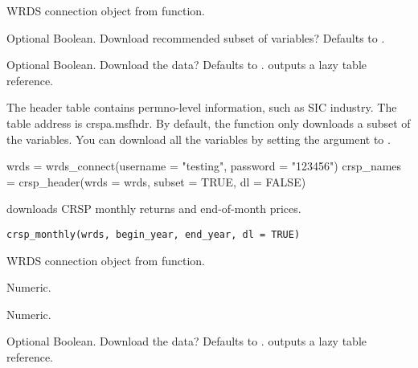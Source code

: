 \documentclass[a4paper]{book}
\begin{document}
%
\begin{Arguments}
\begin{ldescription}
\item[\code{wrds}] WRDS connection object from  function.

\item[\code{subset}] Optional Boolean. Download recommended subset of variables? Defaults to .

\item[\code{dl}] Optional Boolean. Download the data? Defaults to .  outputs a
lazy  table reference.
\end{ldescription}
\end{Arguments}
%
\begin{Details}\relax
The header table contains permno-level information, such as SIC industry. The table
address is crspa.msfhdr. By default, the function only downloads a subset of the variables.
You can download all the variables by setting the  argument to .
\end{Details}
%
\begin{Examples}
\begin{ExampleCode}
wrds = wrds_connect(username = "testing", password = "123456")
crsp_names = crsp_header(wrds = wrds, subset = TRUE, dl = FALSE)
\end{ExampleCode}
\end{Examples}
%
\begin{Description}\relax
{} downloads CRSP monthly returns and end-of-month prices.
\end{Description}
%
\begin{Usage}
\begin{verbatim}
crsp_monthly(wrds, begin_year, end_year, dl = TRUE)
\end{verbatim}
\end{Usage}
%
\begin{Arguments}
\begin{ldescription}
\item[\code{wrds}] WRDS connection object from  function.

\item[\code{begin\_year}] Numeric.

\item[\code{end\_year}] Numeric.

\item[\code{dl}] Optional Boolean. Download the data? Defaults to .  outputs a
lazy  table reference.
\end{ldescription}
\end{Arguments}
\end{document}
